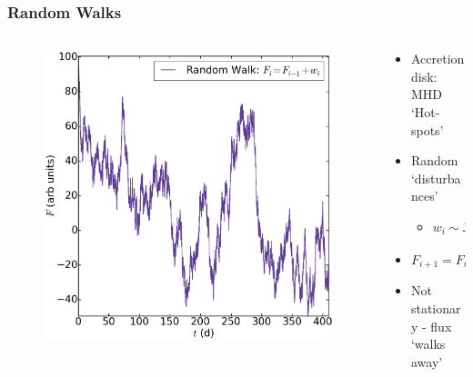 \documentclass[hyperref={pdfpagelabels=false}]{beamer}
\begin{document}
\begin{frame}
\frametitle{Random Walks}
  \begin{columns}
    \centering
    \begin{column}{0.5\textwidth}
      \begin{figure}
        \includegraphics[scale=0.12]{images/RW_Illustration.jpg}
      \end{figure}
      \centering
    \end{column}
    \begin{column}{0.5\textwidth}
    \begin{itemize}
      \item Accretion disk: MHD `Hot-spots'
      \item Random `disturbances'
        \begin{itemize}
          \item $w_{i} \sim \mathcal{N}(0,\sigma^{2})$
        \end{itemize}
      \item $F_{i+1} = F_{i} + w_{i}$
      \item Not stationary - flux `walks away'
    \end{itemize}
    \end{column}
  \end{columns}
\end{frame}
\end{document}
